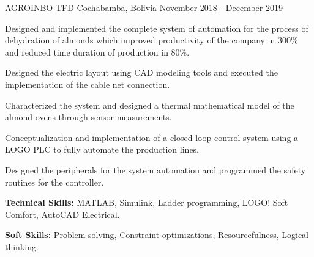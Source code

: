 \begin{cventries}
    {AGROINBO TFD}
    {Cochabamba, Bolivia}
    {November 2018 - December 2019}
    {
      \begin{cvitems}
        \item Designed and implemented the complete system of
        automation for the process of dehydration of almonds which
        improved productivity of the company in 300\% and reduced time
        duration of production in 80\%.
        \item Designed the electric layout using CAD modeling tools
        and executed the implementation of the cable net connection.
        \item Characterized the system and designed a thermal
        mathematical model of the almond ovens through sensor
        measurements.
        \item Conceptualization and implementation of a closed loop
        control system using a LOGO PLC to fully automate the
        production lines.
        \item Designed the peripherals for the system automation and
        programmed the safety routines for the controller.
        \item \textbf{Technical Skills:} MATLAB, Simulink, Ladder
        programming, LOGO! Soft Comfort, AutoCAD Electrical.
        \item \textbf{Soft Skills:} Problem-solving, Constraint
        optimizations, Resourcefulness, Logical thinking.
      \end{cvitems}
    }
\end{cventries}
